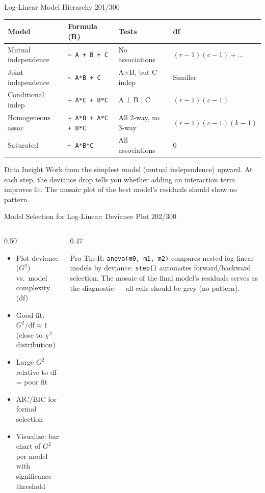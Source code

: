 \documentclass[10pt]{beamer}
\newcommand{\smark}[1]{\hfill{\scriptsize\color{codegray}#1}}
\begin{document}
\begin{frame}{Log-Linear Model Hierarchy}
\smark{201/300}
\centering\small
\begin{tabular}{@{}llll@{}}
    \toprule
    \textbf{Model} & \textbf{Formula (R)} & \textbf{Tests} & \textbf{df} \\
    \midrule
    Mutual independence & \texttt{\textasciitilde\ A + B + C}   & No associations        & $(r-1)(c-1) + \ldots$ \\
    Joint independence  & \texttt{\textasciitilde\ A*B + C}     & A$\times$B, but C indep & Smaller \\
    Conditional indep   & \texttt{\textasciitilde\ A*C + B*C}   & A$\perp$B $|$ C       & $(r-1)(c-1)$ \\
    Homogeneous assoc   & \texttt{\textasciitilde\ A*B + A*C + B*C} & All 2-way, no 3-way & $(r-1)(c-1)(k-1)$ \\
    Saturated           & \texttt{\textasciitilde\ A*B*C}       & All associations      & 0 \\
    \bottomrule
\end{tabular}

\vspace{0.3cm}
\begin{exampleblock}{Data Insight}
    \scriptsize Work from the simplest model (mutual independence) upward. At each step, the deviance drop tells you whether adding an interaction term improves fit. The mosaic plot of the best model's residuals should show no pattern.
\end{exampleblock}
\end{frame}

\begin{frame}{Model Selection for Log-Linear: Deviance Plot}
\smark{202/300}
\begin{columns}[T]
\begin{column}{0.50\textwidth}
\begin{itemize}
    \item Plot deviance ($G^2$) vs.\ model complexity (df)
    \item Good fit: $G^2 / \text{df} \approx 1$ (close to $\chi^2$ distribution)
    \item Large $G^2$ relative to df = poor fit
    \item AIC/BIC for formal selection
    \item Visualize: bar chart of $G^2$ per model with significance threshold
\end{itemize}
\end{column}
\begin{column}{0.47\textwidth}
\begin{alertblock}{Pro-Tip}
    \scriptsize R: \texttt{anova(m0, m1, m2)} compares nested log-linear models by deviance. \texttt{step()} automates forward/backward selection. The mosaic of the final model's residuals serves as the diagnostic --- all cells should be grey (no pattern).
\end{alertblock}
\end{column}
\end{columns}
\end{frame}
\end{document}
